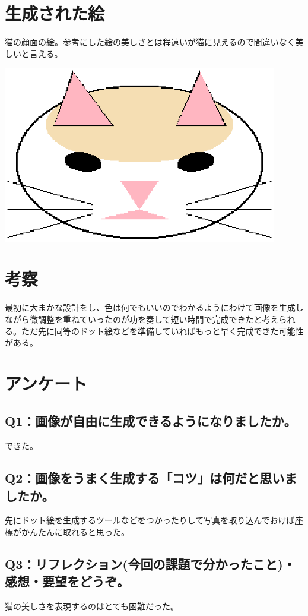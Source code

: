 \documentclass[12pt,a4j]{jarticle}
\begin{document}
\section{生成された絵}
猫の顔面の絵。参考にした絵の美しさとは程遠いが猫に見えるので間違いなく美しいと言える。

\begin{center}
\includegraphics[width=12cm]{cat.ps}
\end{center}


\section{考察}
最初に大まかな設計をし、色は何でもいいのでわかるようにわけて画像を生成しながら微調整を重ねていったのが功を奏して短い時間で完成できたと考えられる。ただ先に同等のドット絵などを準備していればもっと早く完成できた可能性がある。

\section{アンケート}

\subsection{Q1：画像が自由に生成できるようになりましたか。}
できた。

\subsection{Q2：画像をうまく生成する「コツ」は何だと思いましたか。}
先にドット絵を生成するツールなどをつかったりして写真を取り込んでおけば座標がかんたんに取れると思った。

\subsection{Q3：リフレクション(今回の課題で分かったこと)・感想・要望をどうぞ。}
猫の美しさを表現するのはとても困難だった。
\end{document}
